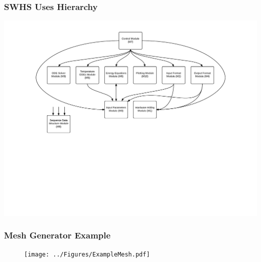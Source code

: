 \documentclass[t,12pt,numbers,fleqn]{beamer}
\begin{document}

\begin{frame}

\frametitle{SWHS Uses Hierarchy}

\begin{center}
\includegraphics[scale=0.55]{../Figures/UsesHierarchy.pdf}
\end{center}

\end{frame}


\begin{frame}
\frametitle{Mesh Generator Example}
\vspace{-1cm}
\begin{figure}[H]
\texttt{[image: ../Figures/ExampleMesh.pdf]}
\end{figure}\end{frame}

\end{document}
